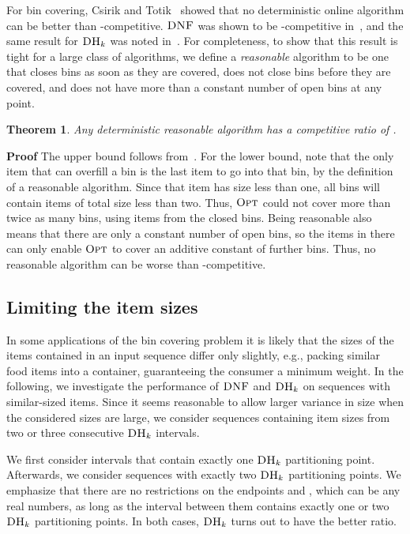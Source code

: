 \documentclass[11pt]{article}
\newtheorem{xtheorem}{Theorem}
\newenvironment{theorem}{\begin{xtheorem}\rm}{\end{xtheorem}}
\newenvironment{proof}{\begin{trivlist}\item[]{\bf Proof }}{\hspace*{\fill}\raisebox{-1pt}{\boldmath}\end{trivlist}}
\newcommand{\OPT}{\ensuremath{\operatorname{\textsc{Opt}}}\xspace}
\newcommand{\DNF}{\ensuremath{\operatorname{\textsc{DNF}}}\xspace}
\newcommand{\DHk}{{\ensuremath{\textsc{DH}_k}}\xspace}
\begin{document}
For bin covering, Csirik and Totik~\cite{C88} showed that no deterministic
online algorithm can be better than -competitive.
\DNF was shown to be -competitive in~\cite{AJKL84j},
and the same result for \DHk was noted in~\cite{EFK12}.
For completeness, to show that this result is tight for a
large class of algorithms,
we define a \emph{reasonable} algorithm to be one that closes bins as
soon as they are covered, does not close bins before
they are covered, and does not have more than a constant number of open
bins at any point.
\begin{theorem}
\label{competitive-reasonable}
Any deterministic reasonable algorithm has a competitive ratio of
.
\end{theorem}
\begin{proof}
The upper bound follows from~\cite{C88}.
For the lower bound, note that
the only item that can overfill a bin is the last item to go into that
bin, by the definition of a reasonable algorithm. Since that item has
size less than one, all bins will contain items of total size
less than two. Thus, \OPT could not cover more than twice as many bins,
using items from the closed bins.
Being reasonable also means that there are only a constant number of
open bins, so the items in there can only enable \OPT to cover
an additive constant of further bins. Thus,
no reasonable algorithm can be worse than -competitive.
\end{proof}

\subsection{Limiting the item sizes}
In some applications of the bin covering problem it is likely that
the sizes of the items contained in an input sequence differ only
slightly, e.g., packing similar food items into a container, guaranteeing
the consumer a minimum weight.
In the following, we investigate the performance of \DNF and
\DHk on sequences with similar-sized items.
Since it seems reasonable to allow larger variance in size when the
considered sizes are large,
we consider sequences containing item sizes from two or three
consecutive \DHk intervals. 

We first consider intervals  that contain exactly one \DHk partitioning point.
Afterwards, we consider sequences with exactly two \DHk partitioning points.
We emphasize that there are no restrictions on the endpoints  and ,
which can be any real numbers,
as long as the interval between them contains exactly one or two \DHk partitioning points.
In both cases, \DHk turns out to have the better ratio.
\end{document}
